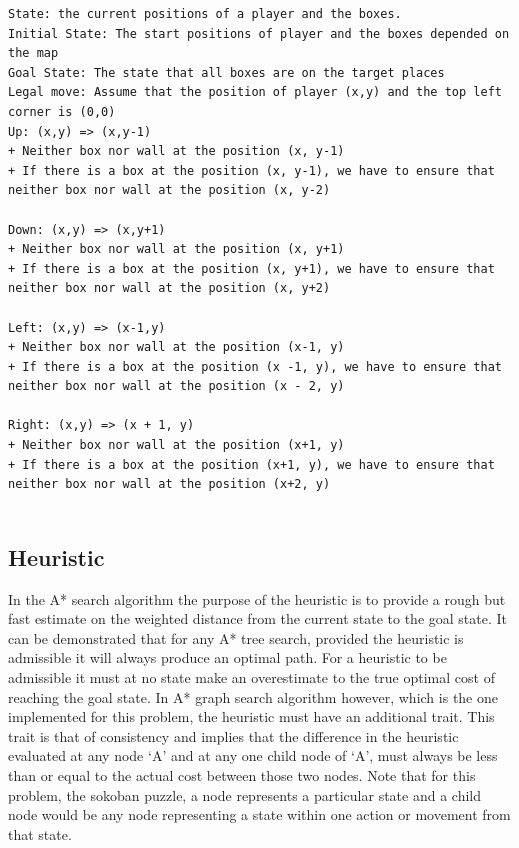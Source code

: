\documentclass[a4paper,12pt]{article}
\begin{document}
\begin{lstlisting}
State: the current positions of a player and the boxes.
Initial State: The start positions of player and the boxes depended on the map
Goal State: The state that all boxes are on the target places
Legal move: Assume that the position of player (x,y) and the top left corner is (0,0)
Up: (x,y) => (x,y-1)
+ Neither box nor wall at the position (x, y-1) 
+ If there is a box at the position (x, y-1), we have to ensure that neither box nor wall at the position (x, y-2)

Down: (x,y) => (x,y+1)
+ Neither box nor wall at the position (x, y+1) 
+ If there is a box at the position (x, y+1), we have to ensure that neither box nor wall at the position (x, y+2)

Left: (x,y) => (x-1,y)
+ Neither box nor wall at the position (x-1, y) 
+ If there is a box at the position (x -1, y), we have to ensure that neither box nor wall at the position (x - 2, y)

Right: (x,y) => (x + 1, y)
+ Neither box nor wall at the position (x+1, y) 
+ If there is a box at the position (x+1, y), we have to ensure that neither box nor wall at the position (x+2, y)
 
\end{lstlisting}

\subsection{Heuristic}

In the A* search algorithm the purpose of the heuristic is to provide a rough but fast estimate on the weighted distance from the current state to the goal state. It can be demonstrated that for any A* tree search, provided the heuristic is admissible it will always produce an optimal path. For a heuristic to be admissible it must at no state make an overestimate to the true optimal cost of reaching the goal state. In A* graph search algorithm however, which is the one implemented for this problem, the heuristic must have an additional trait. This trait is that of consistency and implies that the difference in the heuristic evaluated at any node ‘A’ and at any one child node of ‘A’, must always be less than or equal to the actual cost between those two nodes. Note that for this problem, the sokoban puzzle, a node represents a particular state and a child node would be any node representing a state within one action or movement from that state.
\\
\end{document}
